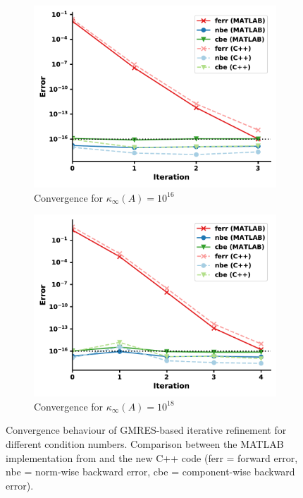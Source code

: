 \begin{figure}[h]
\centering
\begin{subfigure}{.5\textwidth}
  \centering
  \includegraphics[width=\linewidth]{chapters/5_experiments/figures/GMRESe16.pdf}
  \caption{Convergence for $\kappa_\infty(A) = 10^{16}$}
  \label{fig:gmrese16}
\end{subfigure}%
\begin{subfigure}{.5\textwidth}
  \centering
  \includegraphics[width=\linewidth]{chapters/5_experiments/figures/GMRESe18.pdf}
  \caption{Convergence for $\kappa_\infty(A) = 10^{18}$}
  \label{fig:gmrese18}
\end{subfigure}
\caption[GMRES-based IR]{Convergence behaviour of GMRES-based iterative refinement for different condition numbers. Comparison between the MATLAB implementation from \cite{carson_new_2017} and the new C++ code (ferr = forward error, nbe = norm-wise backward error, cbe = component-wise backward error).}
\label{fig:gmrese_ir}
\end{figure}

